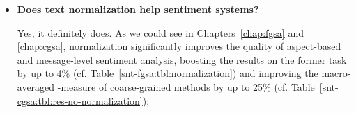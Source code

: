 \begin{itemize}
  \item\textbf{Does text normalization help sentiment systems?}

    Yes, it definitely does.  As we could see in
    Chapters~\ref{chap:fgsa} and \ref{chap:cgsa}, normalization
    significantly improves the quality of aspect-based and
    message-level sentiment analysis, boosting the results on the
    former task by up to 4\% (cf.
    Table~\ref{snt-fgsa:tbl:normalization}) and improving the
    macro-averaged \F{}-measure of coarse-grained methods by up to
    25\% (cf. Table~\ref{snt-cgsa:tbl:res-no-normalization});




\end{itemize}
